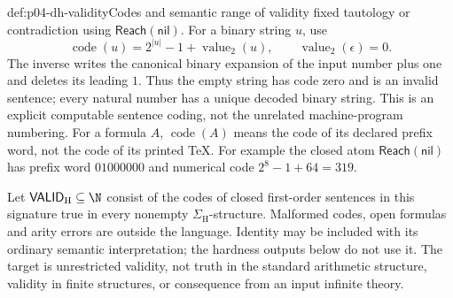 \begin{hbdefinition}{def:p04-dh-validity}{Codes and semantic range of validity}
fixed tautology or contradiction using \(\mathsf{Reach}(\mathsf{nil})\).
For a binary string
\(u\), use
\[
 \operatorname{code}(u)=2^{|u|}-1+\operatorname{value}_2(u),
 \qquad \operatorname{value}_2(\epsilon)=0.
\]
The inverse writes the canonical binary expansion of the input number
plus one and deletes its leading \(1\). Thus the empty string has code
zero and is an invalid sentence; every natural number has a unique
decoded binary string. This is an explicit computable sentence coding,
not the unrelated machine-program numbering.
For a formula \(A\), \(\operatorname{code}(A)\) means the code of its
declared prefix word, not the code of its printed TeX. For example the
closed atom \(\mathsf{Reach}(\mathsf{nil})\) has prefix word \(01000000\)
and numerical code \(2^8-1+64=319\).

Let \(\mathsf{VALID}_{\mathrm H}\subseteq\N\) consist of the codes of
closed first-order sentences in this signature true in every nonempty
\(\Sigma_{\mathrm H}\)-structure. Malformed codes, open formulas and
arity errors are outside the language. Identity may be included with
its ordinary semantic interpretation; the hardness outputs below do
not use it. The target is unrestricted validity, not truth in the
standard arithmetic structure, validity in finite structures, or
consequence from an input infinite theory.
\end{hbdefinition}

